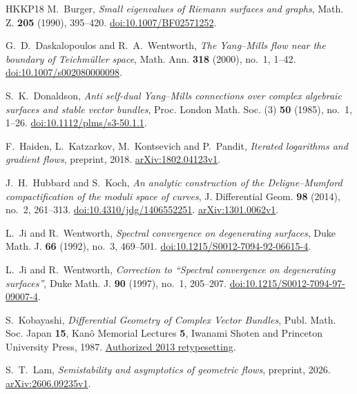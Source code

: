 \begin{thebibliography}{HKKP18}
M.~Burger, \emph{Small eigenvalues of Riemann surfaces and graphs},
Math. Z. \textbf{205} (1990), 395--420.
\href{https://doi.org/10.1007/BF02571252}{doi:10.1007/BF02571252}.

G.~D.~Daskalopoulos and R.~A.~Wentworth,
\emph{The Yang--Mills flow near the boundary of Teichm\"uller space},
Math. Ann. \textbf{318} (2000), no.~1, 1--42.
\href{https://doi.org/10.1007/s002080000098}{doi:10.1007/s002080000098}.

S.~K.~Donaldson,
\emph{Anti self-dual Yang--Mills connections over complex algebraic surfaces and stable vector bundles},
Proc. London Math. Soc. (3) \textbf{50} (1985), no.~1, 1--26.
\href{https://doi.org/10.1112/plms/s3-50.1.1}{doi:10.1112/plms/s3-50.1.1}.

F.~Haiden, L.~Katzarkov, M.~Kontsevich and P.~Pandit,
\emph{Iterated logarithms and gradient flows}, preprint, 2018.
\href{https://arxiv.org/abs/1802.04123v1}{arXiv:1802.04123v1}.

J.~H.~Hubbard and S.~Koch,
\emph{An analytic construction of the Deligne--Mumford compactification of the moduli space of curves},
J. Differential Geom. \textbf{98} (2014), no.~2, 261--313.
\href{https://doi.org/10.4310/jdg/1406552251}{doi:10.4310/jdg/1406552251}.
\href{https://arxiv.org/abs/1301.0062v1}{arXiv:1301.0062v1}.

L.~Ji and R.~Wentworth, \emph{Spectral convergence on degenerating surfaces},
Duke Math. J. \textbf{66} (1992), no.~3, 469--501.
\href{https://doi.org/10.1215/S0012-7094-92-06615-4}{doi:10.1215/S0012-7094-92-06615-4}.

L.~Ji and R.~Wentworth, \emph{Correction to \textquotedblleft Spectral convergence on degenerating surfaces\textquotedblright},
Duke Math. J. \textbf{90} (1997), no.~1, 205--207.
\href{https://doi.org/10.1215/S0012-7094-97-09007-4}{doi:10.1215/S0012-7094-97-09007-4}.

S.~Kobayashi, \emph{Differential Geometry of Complex Vector Bundles},
Publ. Math. Soc. Japan \textbf{15}, Kan\^o Memorial Lectures \textbf{5},
Iwanami Shoten and Princeton University Press, 1987.
\href{https://www.mathsoc.jp/assets/pdf/publications/pubmsj/Vol15.pdf}{Authorized 2013 retypesetting}.

S.~T.~Lam, \emph{Semistability and asymptotics of geometric flows},
preprint, 2026.
\href{https://arxiv.org/abs/2606.09235v1}{arXiv:2606.09235v1}.


\end{thebibliography}
